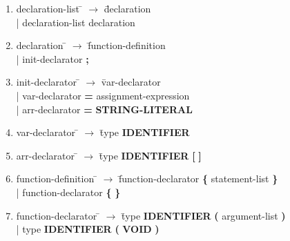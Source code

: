 \small
\begin{enumerate}
\item \begin{tabbing} declaration-list \= $\rightarrow$ \= declaration \\
	\> \hspace*{0.05cm} | \> declaration-list declaration \\
\end{tabbing}

\item \begin{tabbing} declaration \= $\rightarrow$ \=  function-definition \\
	\> \hspace*{0.05cm} | \> init-declarator \textbf{;} \\
\end{tabbing}

\item \begin{tabbing} init-declarator \= $\rightarrow$ \= var-declarator        \\
	\> \hspace*{0.05cm} | \> var-declarator \textbf{=} assignment-expression    \\
	\> \hspace*{0.05cm} | \> arr-declarator \textbf{=} \textbf{STRING-LITERAL}  \\
\end{tabbing}

\item \begin{tabbing} var-declarator \= $\rightarrow$ \= type \textbf{IDENTIFIER} \end{tabbing}

\item \begin{tabbing} arr-declarator \= $\rightarrow$ \= type \textbf{IDENTIFIER} \textbf{[} \textbf{]} \end{tabbing}

\item \begin{tabbing} function-definition \= $\rightarrow$ \= function-declarator \textbf{\{} statement-list \textbf{\}}   \\
	\> \hspace*{0.05cm} 	|\>  function-declarator \textbf{\{}  \textbf{\}}   \\
\end{tabbing}

\item \begin{tabbing} function-declarator \= $\rightarrow$ \= type \textbf{IDENTIFIER} \textbf{(} argument-list \textbf{)} \\
	\> \hspace*{0.05cm} 	|\>  type \textbf{IDENTIFIER} \textbf{(} \textbf{VOID} \textbf{)}                              \\
\end{tabbing}


\end{enumerate}
